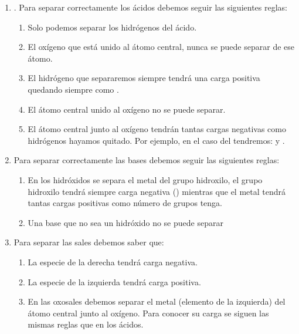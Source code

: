     \begin{enumerate}[label=\numberballmDarkTeal]
        \item {}.
        Para separar correctamente los ácidos debemos seguir las siguientes reglas:

        \begin{enumerate}[label=\letraminuscula]
            \item Solo podemos separar los hidrógenos del ácido.
            \item El oxígeno que está unido al átomo central, nunca se puede separar de ese átomo.
            \item El hidrógeno que separaremos siempre tendrá una carga positiva quedando siempre como .
            \item El átomo central unido al oxígeno no se puede separar.
            \item El átomo central junto al oxígeno tendrán tantas cargas negativas como hidrógenos hayamos quitado.
            Por ejemplo, en el caso del  tendremos:  y .
        \end{enumerate}
        \item {}
        Para separar correctamente las bases debemos seguir las siguientes reglas:
        \begin{enumerate}[label=\letraminuscula]
            \item En los hidróxidos se separa el metal del grupo hidroxilo, el grupo hidroxilo tendrá siempre carga negativa () mientras que el metal tendrá tantas cargas positivas como número de grupos  tenga.
            \item Una base que no sea un hidróxido no se puede separar
        \end{enumerate}
        \item {}
        Para separar las sales debemos saber que:
        \begin{enumerate}[label=\letraminuscula]
            \item La especie de la derecha tendrá carga negativa.
            \item La especie de la izquierda tendrá carga positiva.
            \item En las oxosales debemos separar el metal (elemento de la izquierda) del átomo central junto al oxígeno. Para conocer su carga se siguen las mismas reglas que en los ácidos.
        \end{enumerate}
    \end{enumerate}

